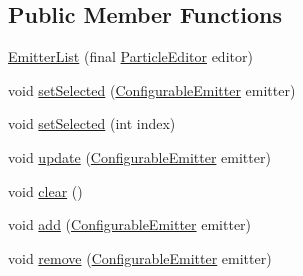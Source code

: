 \subsection*{Public Member Functions}
\begin{DoxyCompactItemize}
\item 
\mbox{\hyperlink{classorg_1_1newdawn_1_1slick_1_1tools_1_1peditor_1_1_emitter_list_a975c297ae89d721d63d06fd7b4c6412d}{Emitter\+List}} (final \mbox{\hyperlink{classorg_1_1newdawn_1_1slick_1_1tools_1_1peditor_1_1_particle_editor}{Particle\+Editor}} editor)
\item 
void \mbox{\hyperlink{classorg_1_1newdawn_1_1slick_1_1tools_1_1peditor_1_1_emitter_list_a2d4c1c8b76d20c25f3a7183ab5b4cd25}{set\+Selected}} (\mbox{\hyperlink{classorg_1_1newdawn_1_1slick_1_1particles_1_1_configurable_emitter}{Configurable\+Emitter}} emitter)
\item 
void \mbox{\hyperlink{classorg_1_1newdawn_1_1slick_1_1tools_1_1peditor_1_1_emitter_list_a85497a336416b7d921ea40d32a880854}{set\+Selected}} (int index)
\item 
void \mbox{\hyperlink{classorg_1_1newdawn_1_1slick_1_1tools_1_1peditor_1_1_emitter_list_a7adaa05d68e52574bcb10b551bbc081d}{update}} (\mbox{\hyperlink{classorg_1_1newdawn_1_1slick_1_1particles_1_1_configurable_emitter}{Configurable\+Emitter}} emitter)
\item 
void \mbox{\hyperlink{classorg_1_1newdawn_1_1slick_1_1tools_1_1peditor_1_1_emitter_list_ae05eade7e60681dcd66ec02b53c1b813}{clear}} ()
\item 
void \mbox{\hyperlink{classorg_1_1newdawn_1_1slick_1_1tools_1_1peditor_1_1_emitter_list_ac399df0532416eee42952010e219cc5b}{add}} (\mbox{\hyperlink{classorg_1_1newdawn_1_1slick_1_1particles_1_1_configurable_emitter}{Configurable\+Emitter}} emitter)
\item 
void \mbox{\hyperlink{classorg_1_1newdawn_1_1slick_1_1tools_1_1peditor_1_1_emitter_list_af62b14c24122b09a3a77f2eaea806e7d}{remove}} (\mbox{\hyperlink{classorg_1_1newdawn_1_1slick_1_1particles_1_1_configurable_emitter}{Configurable\+Emitter}} emitter)
\end{DoxyCompactItemize}
